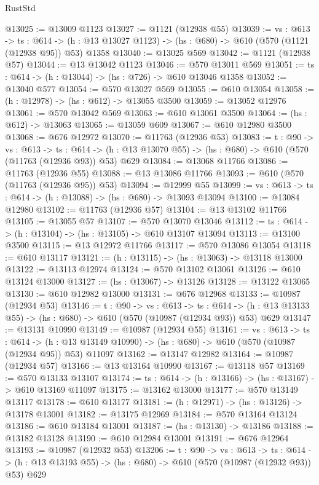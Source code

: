 \begin{lexlean}{RustStd}
\begin{coremodule}
@13025 := @13009 @1123
@13027 := @1121 (@12938 @55)
@13039 := {vs : @613} ->
  {ts : @614} -> (h : @13 @13027 @1123) -> (hs : @680) -> @610 (@570 (@1121 (@12938 @95)) @53) @1358
@13040 := @13025 @569
@13042 := @1121 (@12938 @57)
@13044 := @13 @13042 @1123
@13046 := @570 @13011 @569
@13051 := {ts : @614} -> (h : @13044) -> (hs : @726) -> @610 @13046 @1358
@13052 := @13040 @577
@13054 := @570 @13027 @569
@13055 := @610 @13054
@13058 := (h : @12978) -> (hs : @612) -> @13055 @3500
@13059 := @13052 @12976
@13061 := @570 @13042 @569
@13063 := @610 @13061 @3500
@13064 := (hs : @612) -> @13063
@13065 := @13059 @609
@13067 := @610 @12980 @3500
@13068 := @676 @12972
@13070 := @11763 (@12936 @53)
@13083 := {t : @90} ->
  {vs : @613} ->
  {ts : @614} -> (h : @13 @13070 @55) -> (hs : @680) -> @610 (@570 (@11763 (@12936 @93)) @53) @629
@13084 := @13068 @11766
@13086 := @11763 (@12936 @55)
@13088 := @13 @13086 @11766
@13093 := @610 (@570 (@11763 (@12936 @95)) @53)
@13094 := @12999 @55
@13099 := {vs : @613} -> {ts : @614} -> (h : @13088) -> (hs : @680) -> @13093 @13094
@13100 := @13084 @12980
@13102 := @11763 (@12936 @57)
@13104 := @13 @13102 @11766
@13105 := @13055 @57
@13107 := @570 @13070 @13046
@13112 := {ts : @614} -> (h : @13104) -> (hs : @13105) -> @610 @13107 @13094
@13113 := @13100 @3500
@13115 := @13 @12972 @11766
@13117 := @570 @13086 @13054
@13118 := @610 @13117
@13121 := (h : @13115) -> (hs : @13063) -> @13118 @13000
@13122 := @13113 @12974
@13124 := @570 @13102 @13061
@13126 := @610 @13124 @13000
@13127 := (hs : @13067) -> @13126
@13128 := @13122 @13065
@13130 := @610 @12982 @13000
@13131 := @676 @12968
@13133 := @10987 (@12934 @53)
@13146 := {t : @90} ->
  {vs : @613} ->
  {ts : @614} -> (h : @13 @13133 @55) -> (hs : @680) -> @610 (@570 (@10987 (@12934 @93)) @53) @629
@13147 := @13131 @10990
@13149 := @10987 (@12934 @55)
@13161 := {vs : @613} ->
  {ts : @614} ->
  (h : @13 @13149 @10990) -> (hs : @680) -> @610 (@570 (@10987 (@12934 @95)) @53) @11097
@13162 := @13147 @12982
@13164 := @10987 (@12934 @57)
@13166 := @13 @13164 @10990
@13167 := @13118 @57
@13169 := @570 @13133 @13107
@13174 := {ts : @614} -> (h : @13166) -> (hs : @13167) -> @610 @13169 @11097
@13175 := @13162 @13000
@13177 := @570 @13149 @13117
@13178 := @610 @13177
@13181 := (h : @12971) -> (hs : @13126) -> @13178 @13001
@13182 := @13175 @12969
@13184 := @570 @13164 @13124
@13186 := @610 @13184 @13001
@13187 := (hs : @13130) -> @13186
@13188 := @13182 @13128
@13190 := @610 @12984 @13001
@13191 := @676 @12964
@13193 := @10987 (@12932 @53)
@13206 := {t : @90} ->
  {vs : @613} ->
  {ts : @614} -> (h : @13 @13193 @55) -> (hs : @680) -> @610 (@570 (@10987 (@12932 @93)) @53) @629

\end{coremodule}
\end{lexlean}
